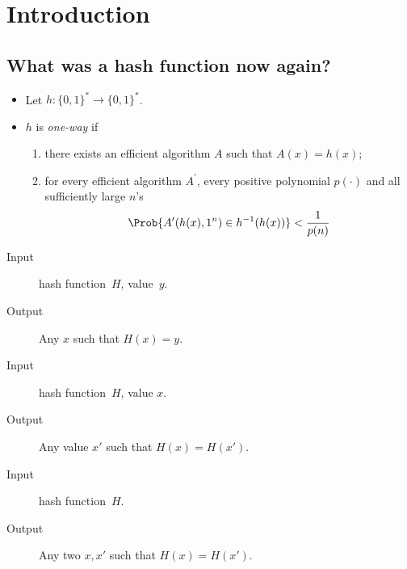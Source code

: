 \mode*

\section{Introduction}

\subsection[Hash functions]{What was a hash function now again?}

\begin{frame}
  \begin{definition}
    \begin{itemize}
      \item Let \(h\colon \{0,1\}^*\to \{0,1\}^*\).
      \item \(h\) is \emph{one-way} if
        \begin{enumerate}
          \item there exists an efficient algorithm \(A\) such that \(A(x) 
              = h(x)\);
          \item for every efficient algorithm \(A^\prime\), every positive 
            polynomial \(p(\cdot)\) and all sufficiently large \(n\)'s
            \[\Prob{A^\prime(h(x), 1^n) \in h^{-1}(h(x))} < \frac{1}{p(n)}\]
        \end{enumerate}
    \end{itemize}
  \end{definition}
\end{frame}

\begin{frame}
  \begin{definition}
    \begin{description}
      \item[Input] hash function~\(H\), value~\(y\).
      \item[Output] Any \(x\) such that \(H(x) = y\).
    \end{description}
  \end{definition}

  \begin{definition}
    \begin{description}
      \item[Input] hash function~\(H\), value \(x\).
      \item[Output] Any value \(x'\) such that \(H(x) = H(x')\).
    \end{description}
  \end{definition}

  \begin{definition}
    \begin{description}
      \item[Input] hash function~\(H\).
      \item[Output] Any two \(x, x'\) such that \(H(x) = H(x')\).
    \end{description}
  \end{definition}
\end{frame}


